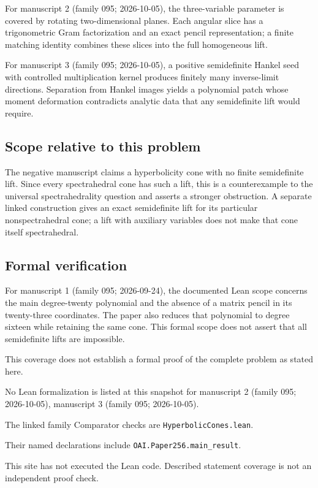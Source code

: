 \documentclass[11pt]{article}
\begin{document}
For manuscript 2 (family 095; 2026-10-05), the three-variable parameter is covered by rotating two-dimensional planes. Each angular slice has a trigonometric Gram factorization and an exact pencil representation; a finite matching identity combines these slices into the full homogeneous lift.

For manuscript 3 (family 095; 2026-10-05), a positive semidefinite Hankel seed with controlled multiplication kernel produces finitely many inverse-limit directions. Separation from Hankel images yields a polynomial patch whose moment deformation contradicts analytic data that any semidefinite lift would require.

\subsection{Scope relative to this problem}
The negative manuscript claims a hyperbolicity cone with no finite semidefinite lift. Since every spectrahedral cone has such a lift, this is a counterexample to the universal spectrahedrality question and asserts a stronger obstruction. A separate linked construction gives an exact semidefinite lift for its particular nonspectrahedral cone; a lift with auxiliary variables does not make that cone itself spectrahedral.

\subsection{Formal verification}
For manuscript 1 (family 095; 2026-09-24), the documented Lean scope concerns the main degree-twenty polynomial and the absence of a matrix pencil in its twenty-three coordinates. The paper also reduces that polynomial to degree sixteen while retaining the same cone. This formal scope does not assert that all semidefinite lifts are impossible.

This coverage does not establish a formal proof of the complete problem as stated here.

No Lean formalization is listed at this snapshot for manuscript 2 (family 095; 2026-10-05), manuscript 3 (family 095; 2026-10-05).

The linked family Comparator checks are \texttt{HyperbolicCones.lean}.

Their named declarations include \texttt{OAI.Paper256.main\_result}.

This site has not executed the Lean code. Described statement coverage is not an independent proof check.
\end{document}
